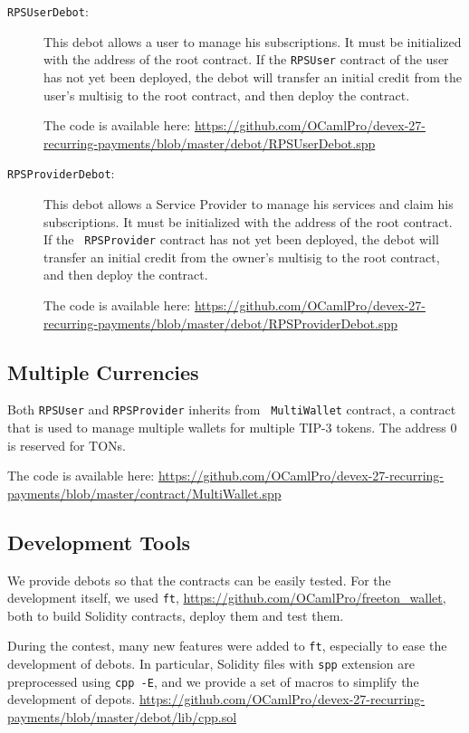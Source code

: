 \documentclass[10pt,a4paper]{article}
\begin{document}
\begin{description}
\item[{\tt RPSUserDebot}:] This debot allows a user to manage his
  subscriptions. It must be initialized with the address of the root
  contract. If the {\tt RPSUser} contract of the user has not yet been
  deployed, the debot will transfer an initial credit from the user's
  multisig to the root contract, and then deploy the contract.

  The code is available here: \url{https://github.com/OCamlPro/devex-27-recurring-payments/blob/master/debot/RPSUserDebot.spp}

  
\item[{\tt RPSProviderDebot}:] This debot allows a Service Provider to
  manage his services and claim his subscriptions. It must be
  initialized with the address of the root contract. If the {\tt
    RPSProvider} contract has not yet been deployed, the debot will
  transfer an initial credit from the owner's multisig to the root
  contract, and then deploy the contract.

  The code is available here: \url{https://github.com/OCamlPro/devex-27-recurring-payments/blob/master/debot/RPSProviderDebot.spp}
  
\end{description}

\subsection{Multiple Currencies}

Both {\tt RPSUser} and {\tt RPSProvider} inherits from {\tt
  MultiWallet} contract, a contract that is used to manage multiple
wallets for multiple TIP-3 tokens. The address 0 is reserved for TONs.

  The code is available here: \url{https://github.com/OCamlPro/devex-27-recurring-payments/blob/master/contract/MultiWallet.spp}

\subsection{Development Tools}

We provide debots so that the contracts can be easily tested. For the
development itself, we used {\tt ft},
\url{https://github.com/OCamlPro/freeton_wallet}, both to build
Solidity contracts, deploy them and test them.

During the contest, many new features were added to {\tt ft},
especially to ease the development of debots. In particular, Solidity
files with {\tt spp} extension are preprocessed using {\tt cpp -E},
and we provide a set of macros to simplify the development of depots.
\url{https://github.com/OCamlPro/devex-27-recurring-payments/blob/master/debot/lib/cpp.sol}
\end{document}
